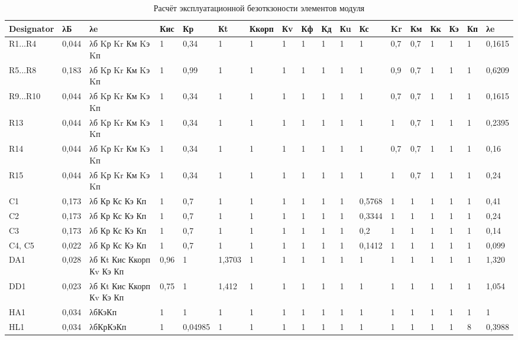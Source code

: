 \begin{sidewaystable}
  \centering
  \small
  \caption{Расчёт эксплуатационной безоткзоности элементов модуля}
  \begin{tabular}{|l |l |l |l |l |l |l |l |l |l |l |l |l |l |l |l |l |l |}
    \hline
Designator  &   λБ  & λe                 & Кис & Кр & Кt & Ккорп & Кv & Кф & Кд & Кu & Кс & Kr & Км & Кк & Кэ & Кп & λe   \\ \hline
R1...R4     & 0,044 & λб Kр Kr Км Kэ Kп  & 1 & 0,34 & 1 & 1 & 1 & 1 & 1 & 1 & 1 & 0,7 & 0,7 & 1 & 1 & 1 & 0,1615 \\ \hline
R5...R8     & 0,183 & λб Kр Kr Км Kэ Kп  & 1 & 0,99 & 1 & 1 & 1 & 1 & 1 & 1 & 1 & 0,9 & 0,7 & 1 & 1 & 1 & 0,6209 \\ \hline
R9...R10    & 0,044 & λб Kр Kr Км Kэ Kп  & 1 & 0,34 & 1 & 1 & 1 & 1 & 1 & 1 & 1 & 0,7 & 0,7 & 1 & 1 & 1 & 0,1615 \\ \hline
R13         & 0,044 & λб Kр Kr Км Kэ Kп  & 1 & 0,34 & 1 & 1 & 1 & 1 & 1 & 1 & 1 & 1 & 0,7 & 1 & 1 & 1 & 0,2395  \\ \hline
R14         & 0,044 & λб Kр Kr Км Kэ Kп  & 1 & 0,34 & 1 & 1 & 1 & 1 & 1 & 1 & 1 & 0,7 & 0,7 & 1 & 1 & 1 & 0,16 \\ \hline
R15         & 0,044 & λб Kр Kr Км Kэ Kп  & 1 & 0,34 & 1 & 1 & 1 & 1 & 1 & 1 & 1 & 1 & 0,7 & 1 & 1 & 1 & 0,24  \\ \hline
C1          & 0,173 & λб Кр Кс Кэ Кп  & 1 & 0,7 & 1 & 1 & 1 & 1 & 1 & 1 & 0,5768 & 1 & 1 & 1 & 1 & 1 & 0,41 \\ \hline
C2          & 0,173 & λб Кр Кс Кэ Кп  & 1 & 0,7 & 1 & 1 & 1 & 1 & 1 & 1 & 0,3344 & 1 & 1 & 1 & 1 & 1 & 0,24 \\ \hline
C3          & 0,173 & λб Кр Кс Кэ Кп  & 1 & 0,7 & 1 & 1 & 1 & 1 & 1 & 1 & 0,2 & 1 & 1 & 1 & 1 & 1 & 0,14 \\ \hline
C4, C5      & 0,022 & λб Кр Кс Кэ Кп  & 1 & 0,7 & 1 & 1 & 1 & 1 & 1 & 1 & 0,1412 & 1 & 1 & 1 & 1 & 1 & 0,099 \\ \hline
DA1         & 0,028 & λб Кt Кис Ккорп Кv Кэ Кп & 0,96 & 1 & 1,3703 & 1 & 1 & 1 & 1 & 1 & 1 & 1 & 1 & 1 & 1 & 1 & 1,320 \\ \hline
DD1         & 0,023 & λб Кt Кис Ккорп Кv Кэ Кп & 0,75 & 1 & 1,412 & 1 & 1 & 1 & 1 & 1 & 1 & 1 & 1 & 1 & 1 & 1 & 1,054 \\ \hline
HA1         & 0,034 & λбКэКп & 1 & 1 & 1 & 1 & 1 & 1 & 1 & 1 & 1 & 1 & 1 & 1 & 1 & 1 & 1 \\ \hline
HL1         & 0,034 & λбКрКэКп & 1 & 0,04985 & 1 & 1 & 1 & 1 & 1 & 1 & 1 & 1 & 1 & 1 & 1 & 8 & 0,3988 \\ \hline

\end{tabular}
\end{sidewaystable}

